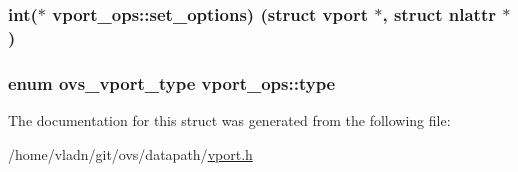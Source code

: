\subsubsection[{set\+\_\+options}]{\setlength{\rightskip}{0pt plus 5cm}int($\ast$ vport\+\_\+ops\+::set\+\_\+options) (struct {\bf vport} $\ast$, struct nlattr $\ast$)}\label{structvport__ops_a2a99b53de4cfaeaf8fb88d41660f5e73}
\hypertarget{structvport__ops_a7dd0d3776e78a2885063d3afd5e78148}{}
\subsubsection[{type}]{\setlength{\rightskip}{0pt plus 5cm}enum {\bf ovs\+\_\+vport\+\_\+type} vport\+\_\+ops\+::type}\label{structvport__ops_a7dd0d3776e78a2885063d3afd5e78148}


The documentation for this struct was generated from the following file\+:\begin{DoxyCompactItemize}
\item 
/home/vladn/git/ovs/datapath/\hyperlink{vport_8h}{vport.\+h}\end{DoxyCompactItemize}
